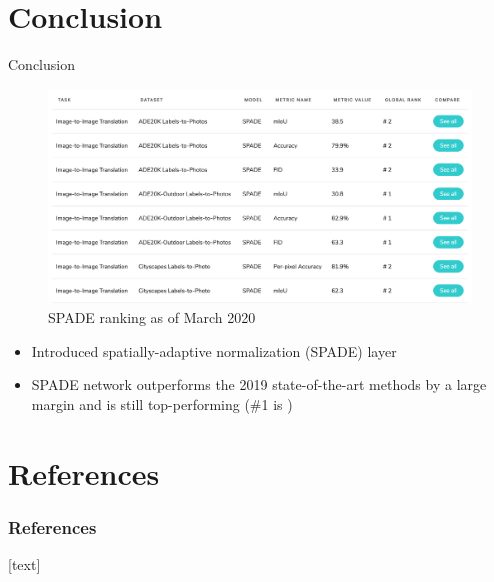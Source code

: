\documentclass{beamer}
\begin{document}
\section{Conclusion}
\begin{frame}{Conclusion}
    \begin{figure}
        \includegraphics[scale=0.2]{figures/performance.png} 
        \caption{SPADE ranking as of March 2020 \cite{papersWithCode}}
    \end{figure}
    \begin{itemize}
        \item Introduced spatially-adaptive normalization (SPADE) layer
        \item SPADE network outperforms the 2019 state-of-the-art methods by a large margin and is still top-performing (\#1 is \cite{liu2019learning})
    \end{itemize}
\end{frame}

\section{References}

\begin{frame}[allowframebreaks]
        \frametitle{References}
        [text]
        
        
\end{frame}
\end{document}
